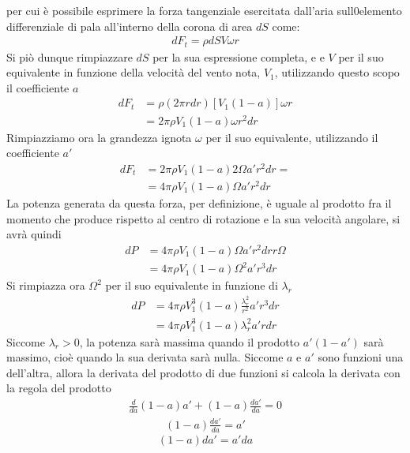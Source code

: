 per cui è possibile esprimere la forza tangenziale esercitata dall'aria sull0elemento differenziale di pala all'interno della corona di area $dS$ come:
\begin{align*}
dF_t = \rho dS V \omega r
\end{align*}
Si piò dunque rimpiazzare $dS$ per la sua espressione completa, e e $V$ per il suo equivalente in funzione della velocità del vento nota, $V_1$, utilizzando questo scopo il coefficiente $a$
\begin{align*}
dF_t &= \rho \left( 2 \pi r dr \right) \left[ V_1 \left(1 -a \right) \right] \omega r\\
& = 2 \pi \rho V_1 \left( 1-a \right) \omega r^2 dr
\end{align*}
Rimpiazziamo ora la grandezza ignota $\omega$ per il suo equivalente, utilizzando il coefficiente $a'$
\begin{align*}
dF_t &= 2 \pi \rho V_1 \left( 1- a \right) 2 \Omega a' r^2 dr = \\
&= 4 \pi \rho V_1 \left(1-a \right) \Omega a' r^2 dr
\end{align*}
La potenza generata da questa forza, per definizione, è uguale al prodotto fra il momento che produce rispetto al centro di rotazione e la sua velocità angolare, si avrà quindi
\begin{align*}
dP &= 4 \pi \rho V_1 \left( 1-a \right) \Omega a' r^2 dr r \Omega \\
&= 4 \pi \rho V_1 \left( 1-a \right) \Omega^2 a' r^3 dr
\end{align*}
Si rimpiazza ora $\Omega^2$ per il suo equivalente in funzione di $\lambda_r$
\begin{align*}
dP &= 4 \pi \rho V_1^3 \left( 1- a \right) \frac{\lambda_r^2}{r^2} a' r^3 dr\\
&= 4 \pi \rho V_1^3 \left( 1 - a \right) \lambda_r^2 a' r dr
\end{align*}
Siccome $\lambda_r > 0$, la potenza sarà massima quando il prodotto $a' \left( 1- a' \right)$ sarà massimo, cioè quando la sua derivata sarà nulla. Siccome $a$ e $a'$ sono funzioni una dell'altra, allora la derivata del prodotto di due funzioni si calcola la derivata con la regola del prodotto
\begin{align*}
\frac{d}{da} \left( 1-a \right) a' + \left( 1 -a \right) \frac{da'}{da} = 0
\end{align*}
\begin{align*}
\left( 1- a \right) \frac{da'}{da} = a'
\end{align*}
\begin{equation}\label{eq:aa'}
\left(1 - a \right) da' = a' da
\end{equation}
